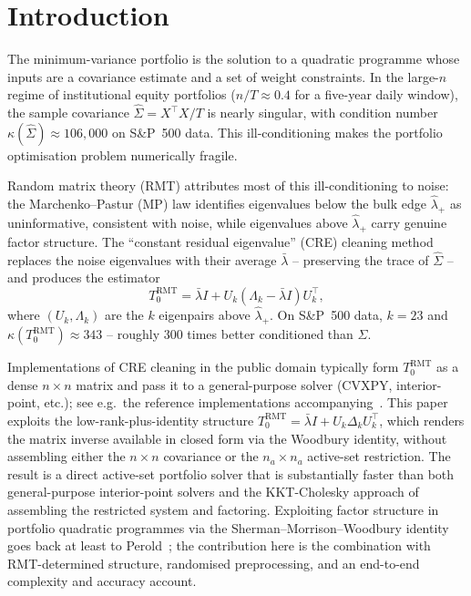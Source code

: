 \section{Introduction}

The minimum-variance portfolio is the solution to a quadratic programme whose
inputs are a covariance estimate and a set of weight constraints. In the large-$n$
regime of institutional equity portfolios ($n/T \approx 0.4$ for a five-year daily
window), the sample covariance $\hat\Sigma = X^\top X/T$ is nearly singular,
with condition number $\kappa(\hat\Sigma) \approx 106{,}000$ on S\&P~500 data.
This ill-conditioning makes the portfolio optimisation problem numerically fragile.

Random matrix theory (RMT) attributes most of this ill-conditioning to noise:
the Marchenko--Pastur (MP) law identifies eigenvalues below the bulk edge
$\hat\lambda_+$ as uninformative, consistent with noise, while eigenvalues above
$\hat\lambda_+$ carry genuine factor structure. The ``constant residual eigenvalue''
(CRE) cleaning method~\cite{laloux1999,bun2017,bouchaud2003} replaces the noise
eigenvalues with their average $\bar\lambda$ -- preserving the trace of
$\hat\Sigma$ -- and produces the estimator
\[
  T_0^{\mathrm{RMT}} = \bar\lambda I + U_k(\Lambda_k - \bar\lambda I)U_k^\top,
\]
where $(U_k, \Lambda_k)$ are the $k$ eigenpairs above $\hat\lambda_+$.
On S\&P~500 data, $k = 23$ and $\kappa(T_0^{\mathrm{RMT}}) \approx 343$ --
roughly $300$ times better conditioned than $\hat\Sigma$.

Implementations of CRE cleaning in the public domain typically form
$T_0^{\mathrm{RMT}}$ as a dense $n \times n$ matrix and pass it to a
general-purpose solver (CVXPY, interior-point, etc.); see e.g.\ the reference
implementations accompanying~\cite{lopezdeprado2018}. This paper exploits the
low-rank-plus-identity structure
$T_0^{\mathrm{RMT}} = \bar\lambda I + U_k \Delta_k U_k^\top$, which renders
the matrix inverse available in closed form via the Woodbury identity, without
assembling either the $n \times n$ covariance or the $n_a \times n_a$ active-set
restriction. The result is a direct active-set portfolio solver that is
substantially faster than both general-purpose interior-point solvers and the
KKT-Cholesky approach of assembling the restricted system and factoring.
Exploiting factor structure in portfolio quadratic programmes via the
Sherman--Morrison--Woodbury identity goes back at least to
Perold~\cite{perold1984}; the contribution here is the combination with
RMT-determined structure, randomised preprocessing, and an end-to-end
complexity and accuracy account.


